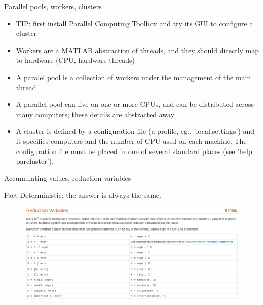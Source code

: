 \documentclass[pdflatex,colorlinks,landscape]{beamer}
\renewcommand\emph[1]{{\color{magenta}#1}}
\begin{document}
\begin{frame}{Parallel pools, workers, clusters}
  \begin{itemize}
  \item TIP: first  install \href{https://www.mathworks.com/products/parallel-computing.html}{Parallel
      Computing Toolbox} and try its GUI to configure a cluster
  \item \emph{Workers} are a MATLAB abstraction of threads, and
    they should directly map to hardware (CPU, hardware threads)
  \item A \emph{paralel pool} is a collection of workers under the
    management of the \emph{main thread}
  \item A parallel pool can live on one or more CPUs, and can be distributed
    across many computers; these details are abstracted away
  \item A \emph{cluster} is defined by a configuration file (a
    \emph{profile}, eg., 'local.settings') and it specifies computers
    and the number of CPU used on each machine. The configuration file
    must be placed in one of several standard places (see 'help
    parcluster').
  \end{itemize}
\end{frame}

\begin{frame}[allowframebreaks]{Accumulating values, reduction variables}
  \begin{tiny}
    
  \end{tiny}
  \begin{tiny}
  \end{tiny}
  \begin{block}{Fact}
    Deterministic: the answer is always the same.
  \end{block}

  \begin{figure}
    \includegraphics[width=\textwidth]{MATLAB/ReductionVariables.png}
  \end{figure}
\end{frame}
\end{document}
